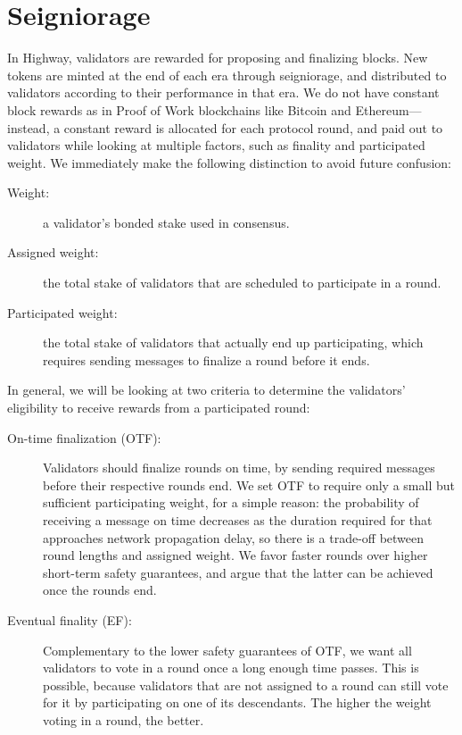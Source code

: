 \section{Seigniorage}

In Highway, validators are rewarded for proposing and finalizing blocks. New tokens are minted at the end of each era through seigniorage, and distributed to validators according to their performance in that era. We do not have constant block rewards as in Proof of Work blockchains like Bitcoin and Ethereum---instead, a constant reward is allocated for each protocol round, and paid out to validators while looking at multiple factors, such as finality and participated weight. We immediately make the following distinction to avoid future confusion:

\begin{description}
\item[Weight:] a validator's bonded stake used in consensus.
\item[Assigned weight:] the total stake of validators that are scheduled to participate in a round.
\item[Participated weight:] the total stake of validators that actually end up participating, which requires sending messages to finalize a round before it ends.
\end{description}

In general, we will be looking at two criteria to determine the validators' eligibility to receive rewards from a participated round:

\begin{description}
\item[On-time finalization (OTF):] Validators should finalize rounds on time, by sending required messages before their respective rounds end. We set OTF to require only a small but sufficient participating weight, for a simple reason: the probability of receiving a message on time decreases as the duration required for that approaches network propagation delay, so there is a trade-off between round lengths and assigned weight. We favor faster rounds over higher short-term safety guarantees, and argue that the latter can be achieved once the rounds end.
\item[Eventual finality (EF):] Complementary to the lower safety guarantees of OTF, we want all validators to vote in a round once a long enough time passes. This is possible, because validators that are not assigned to a round can still vote for it by participating on one of its descendants. The higher the weight voting in a round, the better.
\end{description}

